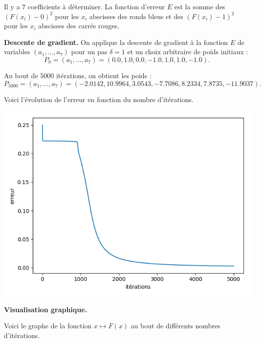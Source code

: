 
Il y a $7$ coefficients à déterminer.
La fonction d'erreur $E$ est la somme des $(F(x_i)-0)^2$ pour les $x_i$ abscisses des ronds bleus et des $(F(x_i)-1)^2$ pour les $x_i$ abscisses des carrés rouges.

\bigskip

\textbf{Descente de gradient.}
On applique la descente de gradient à la fonction $E$ de variables $(a_1,\ldots,a_7)$ pour un pas $\delta = 1$ et un choix arbitraire de poids initiaux :
$$P_0 = (a_1,\ldots,a_7) = (0.0, 1.0, 0.0, -1.0, 1.0, 1.0, -1.0).$$

Au bout de $5000$ itérations, on obtient les poids :
$$P_{5000} = (a_1,\ldots,a_7) = (-2.0142, 10.9964, 3.0543, -7.7086, 8.2334, 7.8735, -11.9037).$$


Voici l'évolution de l'erreur en fonction du nombre d'itérations.
\begin{center}
	\includegraphics[scale=\myscale,scale=0.5]{figures/retro_03_f}
\end{center}


\bigskip

\textbf{Visualisation graphique.}

Voici le graphe de la fonction $x \mapsto F(x)$ au bout de différents nombres d'itérations.


